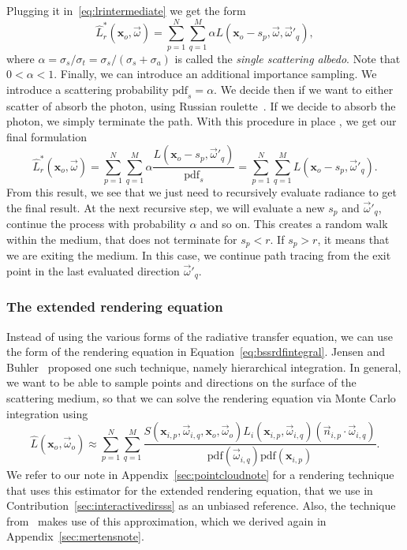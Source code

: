 Plugging it in~\ref{eq:lrintermediate} we get the form
\begin{equation*}
\hat{L}_r^*(\mathbf{x}_o, \vec{\omega}) = \sum_{p=1}^N \sum_{q=1}^M \alpha L(\mathbf{x}_o - s_p, \vec{\omega}, \vec{\omega}'_q),
\end{equation*}
where $\alpha = \sigma_s / \sigma_t = \sigma_s / (\sigma_s + \sigma_a)  $ is called the \emph{single scattering albedo}. Note that $0 < \alpha < 1$.  Finally, we can introduce an additional importance sampling. We introduce a scattering probability $\text{pdf}_s = \alpha$. We decide then if we want to either scatter of absorb the photon, using Russian roulette~\cite{Arvo1990}. If we decide to absorb the photon, we simply terminate the path. With this procedure in place , we get our final formulation
\begin{equation*}
\hat{L}_r^*(\mathbf{x}_o, \vec{\omega}) = \sum_{p=1}^N \sum_{q=1}^M\alpha \frac{L(\mathbf{x}_o - s_p, \vec{\omega}'_q)} {\text{pdf}_s} = \sum_{p=1}^N\sum_{q=1}^M L(\mathbf{x}_o - s_p, \vec{\omega}'_q). 
\end{equation*}
From this result, we see that we just need to recursively evaluate radiance to get the final result. At the next recursive step, we will evaluate a new $s_p$ and $\vec{\omega}'_q$, continue the process with probability $\alpha$ and so on. This creates a random walk within the medium, that does not terminate for $s_p < r$. If $s_p > r$, it means that we are exiting the medium. In this case, we continue path tracing from the exit point in the last evaluated direction $\vec{\omega}'_q$.

\subsubsection{The extended rendering equation}

Instead of using the various forms of the radiative transfer equation, we can use the form of the rendering equation in Equation~\ref{eq:bssrdfintegral}. Jensen and Buhler~\cite{Jensen2002} proposed one such technique, namely hierarchical integration. In general, we want to be able to sample points and directions on the surface of the scattering medium, so that we can solve the rendering equation via Monte Carlo integration using
\begin{equation*}
\hat{L}(\mathbf{x}_o, \vec{\omega}_o) \approx \sum_{p = 1}^N \sum_{q = 1}^M \frac{S(\mathbf{x}_{i,p}, \vec{\omega}_{i,q}, \mathbf{x}_o, \vec{\omega}_o) L_i(\mathbf{x}_{i,p}, \vec{\omega}_{i,q}) (\vec{n}_{i,p} \cdot \vec{\omega}_{i,q})}{\text{pdf}(\vec{\omega}_{i,q}) \text{pdf}(\mathbf{x}_{i,p})}.
\end{equation*}
We refer to our note in Appendix~\ref{sec:pointcloudnote} for a rendering technique that uses this estimator for the extended rendering equation, that we use in Contribution~\ref{sec:interactivedirsss} as an unbiased reference. Also, the technique from~\cite{Mertens2003} makes use of this approximation, which we derived again in Appendix~\ref{sec:mertensnote}.

